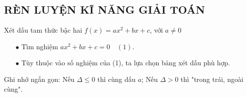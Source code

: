 \subsection{RÈN LUYỆN KĨ NĂNG GIẢI TOÁN}
\begin{dang}{Xét dấu tam thức bậc hai $f(x)=ax^2+bx+c$, với $a \ne 0$}
	\begin{itemize}
		\item [$\bullet$] Tìm nghiệm $ax^2+bx+c=0 \quad (1)$.
		\item [$\bullet$] Tùy thuộc vào số nghiệm của (1), ta lựa chọn bảng xét dấu phù hợp.
	\end{itemize}
\begin{note}
	Ghi nhớ ngắn gọn: Nếu $\Delta \le 0$ thì cùng dấu $a$; Nếu $\Delta >0 $ thì  "trong trái, ngoài cùng".
\end{note}
\end{dang}

